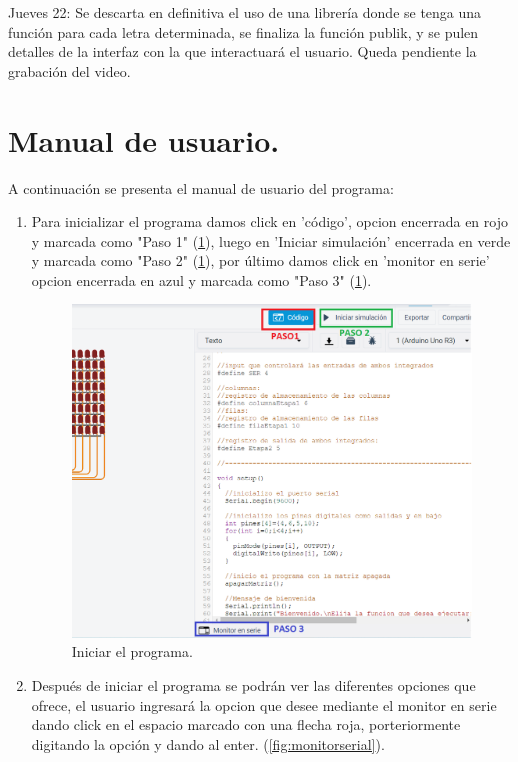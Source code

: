 \documentclass{article}
\begin{document}
\newpage
Jueves 22: Se descarta en definitiva el uso de una librería donde se tenga una función para cada letra determinada, se finaliza la función publik, y se pulen detalles de la interfaz con la que interactuará el usuario. Queda pendiente la grabación del video.

\section{Manual de usuario.}
A continuación se presenta el manual de usuario del programa:
\begin{enumerate}
\item Para inicializar el programa damos click en 'código', opcion encerrada en rojo y marcada como "Paso 1" (\ref{fig:paso1}), luego en 'Iniciar simulación' encerrada en verde y marcada como "Paso 2"  (\ref{fig:paso1}), por último damos click en 'monitor en serie' opcion encerrada en azul y marcada como "Paso 3" (\ref{fig:paso1}).
 
 \begin{figure}[h]
\includegraphics[scale=0.5]{PASO1.png}
\centering
\caption{Iniciar el programa.}
\label{fig:paso1}
\end{figure}

\item Después de iniciar el programa se podrán ver las diferentes opciones que ofrece, el usuario ingresará la opcion que desee mediante el monitor en serie dando click en el espacio marcado con una flecha roja, porteriormente digitando la opción y dando al enter. (\ref{fig:monitorserial}).


\end{enumerate}
\end{document}
